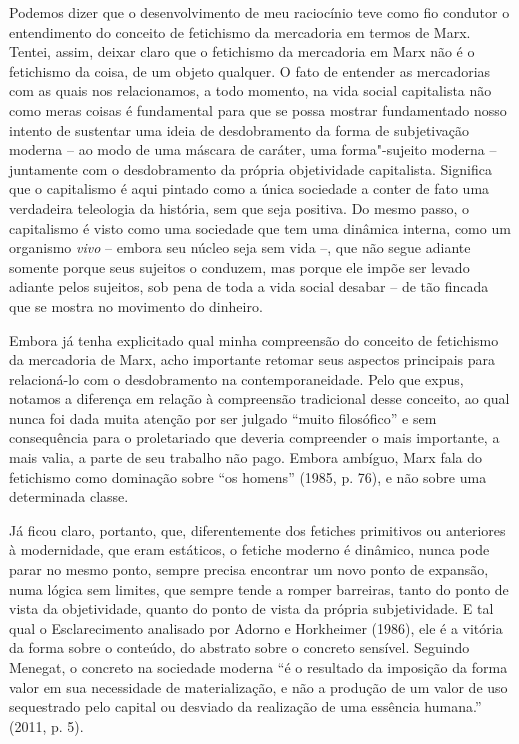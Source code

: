 Podemos dizer que o desenvolvimento de meu raciocínio teve como fio
condutor o entendimento do conceito de fetichismo da mercadoria em
termos de Marx. Tentei, assim, deixar claro que o fetichismo da
mercadoria em Marx não é o fetichismo da coisa, de um objeto qualquer. O
fato de entender as mercadorias com as quais nos relacionamos, a todo
momento, na vida social capitalista não como meras coisas é fundamental
para que se possa mostrar fundamentado nosso intento de sustentar uma
ideia de desdobramento da forma de subjetivação moderna -- ao modo de
uma máscara de caráter, uma forma"-sujeito moderna -- juntamente com o
desdobramento da própria objetividade capitalista. Significa que o
capitalismo é aqui pintado como a única sociedade a conter de fato
uma verdadeira teleologia da história, sem que seja positiva. Do mesmo
passo, o capitalismo é visto como uma sociedade que tem uma dinâmica
interna, como um organismo \emph{vivo} -- embora seu núcleo seja sem
vida --, que não segue adiante somente porque seus sujeitos o conduzem,
mas porque ele impõe ser levado adiante pelos sujeitos, sob pena de toda
a vida social desabar -- de tão fincada que se mostra no movimento do
dinheiro.

Embora já tenha explicitado qual minha compreensão do conceito de
fetichismo da mercadoria de Marx, acho importante retomar seus
aspectos principais para relacioná-lo com o desdobramento na
contemporaneidade. Pelo que expus, notamos a diferença em relação à
compreensão tradicional desse conceito, ao qual nunca foi dada muita
atenção por ser julgado ``muito filosófico'' e sem consequência para o
proletariado que deveria compreender o mais importante, a mais valia, a
parte de seu trabalho não pago. Embora ambíguo, Marx fala do fetichismo
como dominação sobre ``os homens'' (1985, p. 76), e não sobre uma
determinada classe.

Já ficou claro, portanto, que, diferentemente dos fetiches primitivos
ou anteriores à modernidade, que eram estáticos, o fetiche moderno é
dinâmico, nunca pode parar no mesmo ponto, sempre precisa encontrar um
novo ponto de expansão, numa lógica sem limites, que sempre tende a
romper barreiras, tanto do ponto de vista da objetividade, quanto do
ponto de vista da própria subjetividade. E tal qual o Esclarecimento
analisado por Adorno e Horkheimer (1986), ele é a vitória da forma sobre
o conteúdo, do abstrato sobre o concreto sensível. Seguindo Menegat, o
concreto na sociedade moderna ``é o resultado da imposição da forma
valor em sua necessidade de materialização, e não a produção de um valor
de uso sequestrado pelo capital ou desviado da realização de uma
essência humana.'' (2011, p. 5).

